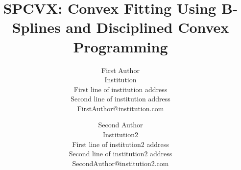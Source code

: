 \documentclass[10pt,twocolumn]{article}          %
\begin{document}
\title{SPCVX: Convex Fitting Using B-Splines and Disciplined Convex Programming}

\author{First Author\\
Institution\\
First line of institution address\\ Second line of institution address\\ 
FirstAuthor@institution.com\\
\and
Second Author\\
Institution2\\
First line of institution2 address\\ Second line of institution2 address\\ 
SecondAuthor@institution2.com\\
}

\maketitle
\thispagestyle{empty}

\begin{abstract}
\end{abstract}

\end{document}
